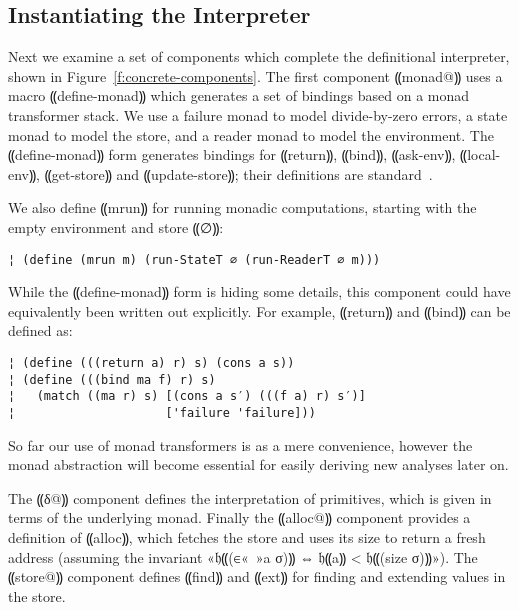 \subsection{Instantiating the Interpreter}

Next we examine a set of components which complete the definitional
interpreter, shown in Figure~\ref{f:concrete-components}. The first component
⸨monad@⸩ uses a macro ⸨define-monad⸩ which generates a set of bindings based on
a monad transformer stack.  We use a failure monad to model divide-by-zero
errors, a state monad to model the store, and a reader monad to model the
environment.  The ⸨define-monad⸩ form generates bindings for ⸨return⸩, ⸨bind⸩,
⸨ask-env⸩, ⸨local-env⸩, ⸨get-store⸩ and ⸨update-store⸩; their definitions are
standard~\cite{dvanhorn:Liang1995Monad}. 

We also define ⸨mrun⸩ for running monadic computations, starting with the empty
environment and store ⸨∅⸩:
\begin{lstlisting}
¦ (define (mrun m) (run-StateT ∅ (run-ReaderT ∅ m)))
\end{lstlisting}
While the ⸨define-monad⸩ form is hiding some details, this component could have
equivalently been written out explicitly. For example, ⸨return⸩ and ⸨bind⸩ can
be defined as:
\begin{lstlisting}
¦ (define (((return a) r) s) (cons a s))
¦ (define (((bind ma f) r) s)
¦   (match ((ma r) s) [(cons a s′) (((f a) r) s′)]
¦                     ['failure 'failure]))
\end{lstlisting}
So far our use of monad transformers is as a mere convenience, however the
monad abstraction will become essential for easily deriving new analyses later
on.

The ⸨δ@⸩ component defines the interpretation of primitives, which is given in
terms of the underlying monad.  Finally the ⸨alloc@⸩ component provides a
definition of ⸨alloc⸩, which fetches the store and uses its size to return a
fresh address (assuming the invariant «𝔥⸨(∈«\ »a σ)⸩ ⇔ 𝔥⸨a⸩ < 𝔥⸨(size σ)⸩»).
The ⸨store@⸩ component defines ⸨find⸩ and ⸨ext⸩ for finding and extending
values in the store.

